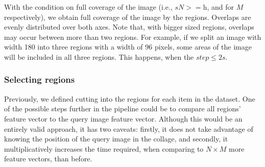 With the condition on full coverage of the image (i.e., \(s N >= \text{h}\), and for $M$ respectively), we obtain full coverage of the image by the regions. Overlaps are evenly distributed over both axes. Note that, with bigger sized regions, overlaps may occur between more than two regions. For example, if we split an image with width 180 into three regions with a width of 96 pixels, some areas of the image will be included in all three regions. This happens, when the $step \leq 2 s$.





\subsubsection{Selecting regions}

Previously, we defined cutting into the regions for each item in the dataset. One of the possible steps further in the pipeline could be to compare all regions' feature vector to the query image feature vector. Although this would be an entirely valid approach, it has two caveats: firstly, it does not take advantage of knowing the position of the query image in the collage, and secondly, it multiplicatively increases the time required, when comparing to $N \times M$ more feature vectors, than before.

